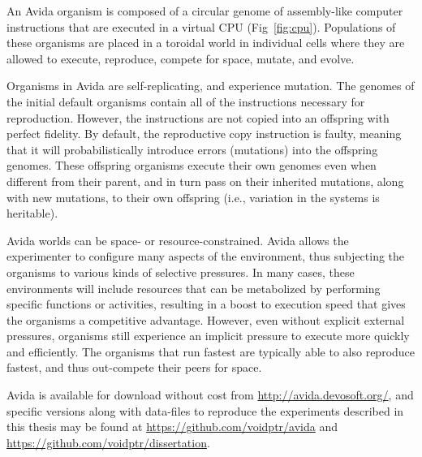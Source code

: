 \documentclass[PhD]{msu-thesis}
\begin{document}
An Avida organism is composed of a circular genome of assembly-like computer instructions that are executed in a virtual CPU (Fig~\ref{fig:cpu}). Populations of these organisms are placed in a toroidal world in individual cells where they are allowed to execute, reproduce, compete for space, mutate, and evolve.

Organisms in Avida are self-replicating, and experience mutation. The genomes of the initial default organisms contain all of the instructions necessary for reproduction. However, the instructions are not copied into an offspring with perfect fidelity. By default, the reproductive copy instruction is faulty, meaning that it will probabilistically introduce errors (mutations) into the offspring genomes. These offspring organisms execute their own genomes even when different from their parent, and in turn pass on their inherited mutations, along with new mutations, to their own offspring (i.e., variation in the systems is heritable).

Avida worlds can be space- or resource-constrained. Avida allows the experimenter to configure many aspects of the environment, thus subjecting the organisms to various kinds of selective pressures.  In many cases, these environments will include resources that can be metabolized by performing specific functions or activities, resulting in a boost to execution speed that gives the organisms a competitive advantage. However, even without explicit external pressures, organisms still experience an implicit pressure to execute more quickly and efficiently. The organisms that run fastest are typically able to also reproduce fastest, and thus out-compete their peers for space.

Avida is available for download without cost from \url{http://avida.devosoft.org/}, and specific versions along with data-files to reproduce the experiments described in this thesis may be found at \url{https://github.com/voidptr/avida} and \url{https://github.com/voidptr/dissertation}.


\end{document}
